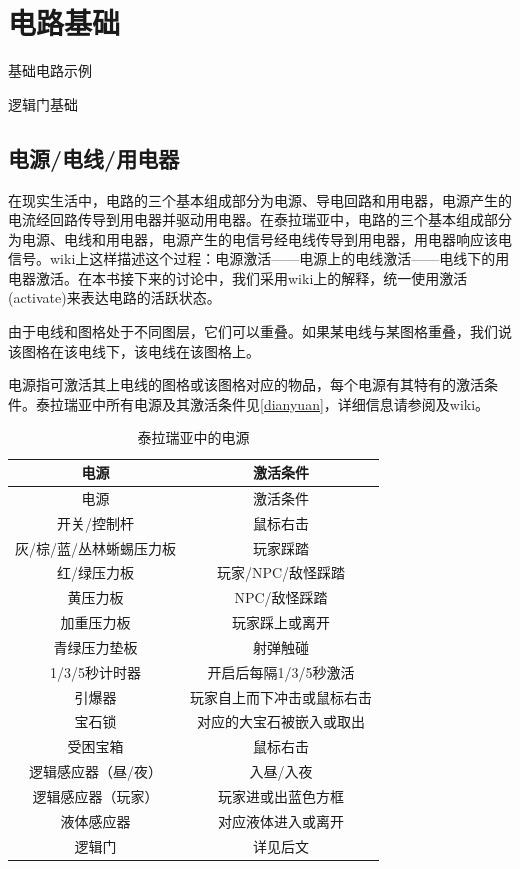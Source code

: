 \chapter{电路基础}\label{dianlujichu}

\begin{introduction}
\item {}
\item 基础电路示例
\item 逻辑门基础
\end{introduction}

\section{电源/电线/用电器}\label{sec10}

在现实生活中，电路的三个基本组成部分为电源、导电回路和用电器，电源产生的电流经回路传导到用电器并驱动用电器。在泰拉瑞亚中，电路的三个基本组成部分为电源、电线和用电器，电源产生的电信号经电线传导到用电器，用电器响应该电信号。wiki上这样描述这个过程：电源激活——电源上的电线激活——电线下的用电器激活。在本书接下来的讨论中，我们采用wiki上的解释，统一使用激活(activate)来表达电路的活跃状态。

由于电线和图格处于不同图层，它们可以重叠。如果某电线与某图格重叠，我们说该图格在该电线下，该电线在该图格上。

电源指可激活其上电线的图格或该图格对应的物品，每个电源有其特有的激活条件。泰拉瑞亚中所有电源及其激活条件见\autoref{dianyuan}，详细信息请参阅及wiki。

\begin{longtable}{|c|c|}
\caption{泰拉瑞亚中的电源}\label{dianyuan}\\\hline
电源					&	激活条件					\\
\hline
\endfirsthead
\hline
电源					&	激活条件					\\
\hline
\endhead
\hline
\endfoot
开关/控制杆				&	鼠标右击					\\
\hline
灰/棕/蓝/丛林蜥蜴压力板	&	玩家踩踏					\\
\hline
红/绿压力板				&	玩家/NPC/敌怪踩踏			\\
\hline
黄压力板				&	NPC/敌怪踩踏				\\
\hline
加重压力板				&	玩家踩上或离开				\\
\hline
青绿压力垫板			&	射弹触碰					\\
\hline
1/3/5秒计时器			&	开启后每隔1/3/5秒激活		\\
\hline
引爆器					&	玩家自上而下冲击或鼠标右击	\\
\hline
宝石锁					&	对应的大宝石被嵌入或取出	\\
\hline
受困宝箱				&	鼠标右击					\\
\hline
逻辑感应器（昼/夜）		&	入昼/入夜					\\
\hline
逻辑感应器（玩家）		&	玩家进或出蓝色方框			\\
\hline
液体感应器				&	对应液体进入或离开			\\
\hline
逻辑门					&	详见后文					\\
\end{longtable}

